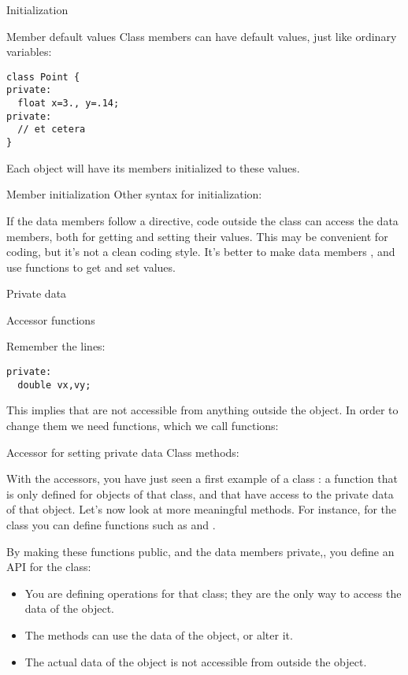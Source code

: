  {Initialization}

\begin{block}{Member default values}
  \label{sl:class-defval}
  Class members can have default values, just like ordinary variables:
\begin{verbatim}
class Point {
private:
  float x=3., y=.14;
private:
  // et cetera
}
\end{verbatim}
  Each object will have its members initialized to these values.
\end{block}

\begin{block}{Member initialization}
  \label{sl:class-init}
  Other syntax for initialization:
\end{block}

If the data members follow a  directive, code
outside the class can access the data members, both for getting and
setting their values. This may be convenient for coding, but it's not
a clean coding style. It's better to make data members
, and use  functions to get
and set values.

\begin{block}{Private data}
  \label{sl:class-private}
\end{block}

 {Accessor functions}

Remember the lines:
\begin{verbatim}
private:
  double vx,vy;
\end{verbatim}
This implies that  are not accessible from anything outside
the object. In order to change them we need functions, which we call
 functions:

\begin{block}{Accessor for setting private data}
  \label{sl:class-private-set}
  Class methods:
\end{block}

With the accessors, you have just seen a first example of a class
: a function that is only defined for objects of
that class, and that have access to the private data of that object.
Let's now look at more meaningful methods. For instance, for the
 class you can define functions such as  and
. 
%

By making these functions public, and the data members
private,, you define an \acf{API} for the class:
\begin{itemize}
\item You are defining operations for that class; they are the only
  way to access the data of the object.
\item The methods can use the data of the object, or alter it.
\item The actual data of the object is not accessible from outside the
  object.
\end{itemize}


